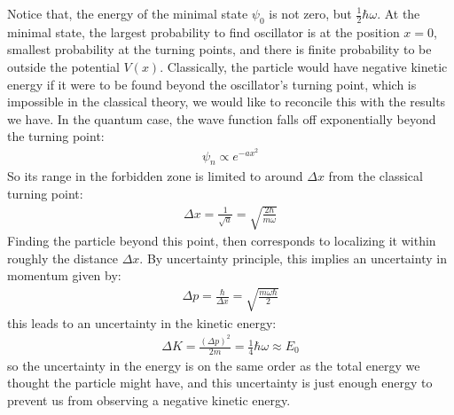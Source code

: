 \documentclass[11pt]{article}
\theoremstyle{break}
\theoremstyle{break}
\begin{document}
Notice that, the energy of the minimal state $\psi_0$ is not zero, but $\frac{1}{2}\hbar \omega$. At the minimal state, the largest probability to find oscillator is at the position $x=0$, smallest probability at the turning points, and there is finite probability to be outside the potential $V(x)$.  Classically, the particle would have negative kinetic energy if it were to be found beyond the oscillator's turning point, which is impossible in the classical theory, we would like to reconcile this with the results we have. In the quantum case, the wave function falls off exponentially beyond the turning point:
\begin{align*}
\psi_n \propto e^{-a x^2}
\end{align*}
So its range in the forbidden zone is limited to around $\Delta  x$ from the classical turning point:
\begin{align*}
\Delta x = \frac{1}{\sqrt{a}} = \sqrt{\frac{2\hbar}{m \omega}}
\end{align*}
Finding the particle beyond this point, then corresponds to localizing it within roughly the distance $\Delta x$. By uncertainty principle, this implies an uncertainty in momentum given by:
\begin{align*}
\Delta p = \frac{\hbar}{\Delta x} =\sqrt{\frac{m\omega \hbar}{2}}
\end{align*}
this leads to an uncertainty in the kinetic energy:
\begin{align*}
\Delta K = \frac{(\Delta p)^2}{2m} = \frac{1}{4}\hbar \omega  \approx E_0
\end{align*}
so the uncertainty in the energy is on the same order as the total energy we thought the particle might have, and this uncertainty is just enough energy to prevent us from observing a negative kinetic energy. \\

\newpage
\end{document}
